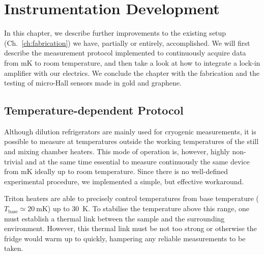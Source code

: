 \chapter{Instrumentation Development}\label{ch:instrumentation_development}

In this chapter, we describe further improvements to the existing setup (Ch.~\ref{ch:fabrication}) we have, partially or entirely, accomplished. We will first describe the measurement protocol implemented to continuously acquire data from \si{\milli\kelvin} to room temperature, and then take a look at how to integrate a lock-in amplifier with our electrics. We conclude the chapter with the fabrication and the testing of micro-Hall sensors made in gold and graphene.

\section{Temperature-dependent Protocol}\label{ch:instr_dev:sec:temperature_protocol}

Although dilution refrigerators are mainly used for cryogenic measurements, it is possible to measure at temperatures outside the working temperatures of the still and mixing chamber heaters. This mode of operation is, however, highly non-trivial and at the same time essential to measure continuously the same device from \si{\milli\kelvin} ideally up to room temperature. Since there is no well-defined experimental procedure, we implemented a simple, but effective workaround.

Triton heaters are able to precisely control temperatures from base temperature ($T_\textrm{base}\simeq\SI{20}{\milli\kelvin}$) up to \SI{30}{\kelvin}. To stabilise the temperature above this range, one must establish a thermal link between the sample and the surrounding environment. However, this thermal link must be not too strong or otherwise the fridge would warm up to quickly, hampering any reliable measurements to be taken.

